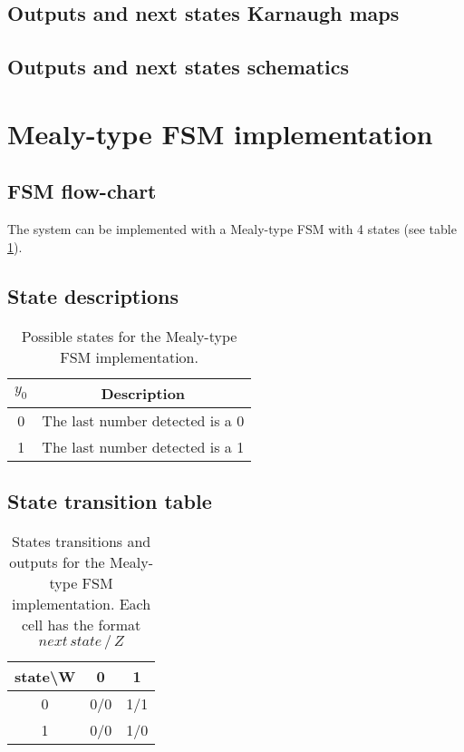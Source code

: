 \documentclass[../../e3_tp3_main.tex]{subfiles}
\begin{document}
\subsection{Outputs and next states Karnaugh maps}

\subsection{Outputs and next states schematics}


\section{Mealy-type FSM implementation}
\subsection{FSM flow-chart}

The system can be implemented with a Mealy-type FSM with 4 states (see table \ref{tab:ej3_mealy_states}).

\subsection{State descriptions}
\begin{table}[H]	%
	\centering
	\begin{tabular}{|c|c|}
	\hline	
	$y_0$  & Description\\	
	\hline 
	0 & The last number detected is a 0\\ 
	\hline 
	1 & The last number detected is a 1\\ 
	\hline 

	\end{tabular} 
	\caption{Possible states for the Mealy-type FSM implementation.}
	\label{tab:ej3_mealy_states}
\end{table}


\subsection{State transition table}
\begin{table}[H]
	\centering
	\begin{tabular}{|c|c|c|}
		\hline 
		state\textbackslash W & 0 & 1 \\ 
		\hline 
		0 & 0/0 & 1/1 \\ 
		\hline 
		1 & 0/0 & 1/0 \\ 
		\hline 
	\end{tabular} 
	\caption[States transitions and outputs for the Mealy-type FSM implementation]{States transitions and outputs for the Mealy-type FSM implementation. Each cell has the format $next\, state\, / \, Z$}
	\label{tab:ej3_mealy_transitions}
\end{table}
\end{document}
